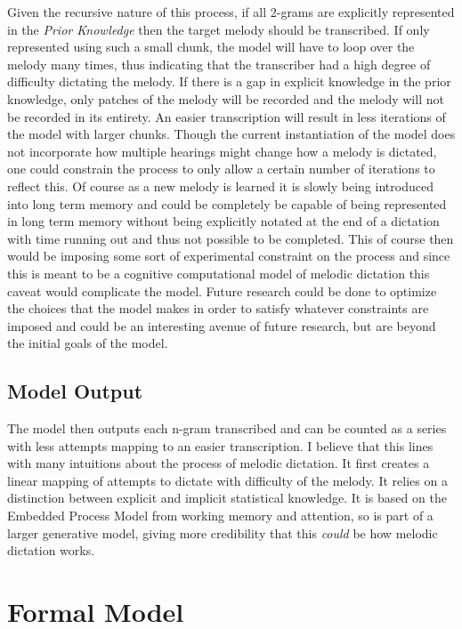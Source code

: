 \documentclass[]{book}
\begin{document}
Given the recursive nature of this process, if all 2-grams are explicitly represented in the \emph{Prior Knowledge} then the target melody should be transcribed.
If only represented using such a small chunk, the model will have to loop over the melody many times, thus indicating that the transcriber had a high degree of difficulty dictating the melody.
If there is a gap in explicit knowledge in the prior knowledge, only patches of the melody will be recorded and the melody will not be recorded in its entirety.
An easier transcription will result in less iterations of the model with larger chunks.
Though the current instantiation of the model does not incorporate how multiple hearings might change how a melody is dictated, one could constrain the process to only allow a certain number of iterations to reflect this.
Of course as a new melody is learned it is slowly being introduced into long term memory and could be completely be capable of being represented in long term memory without being explicitly notated at the end of a dictation with time running out and thus not possible to be completed.
This of course then would be imposing some sort of experimental constraint on the process and since this is meant to be a cognitive computational model of melodic dictation this caveat would complicate the model.
Future research could be done to optimize the choices that the model makes in order to satisfy whatever constraints are imposed and could be an interesting avenue of future research, but are beyond the initial goals of the model.

\hypertarget{model-output}{%
\subsection{Model Output}\label{model-output}}

The model then outputs each n-gram transcribed and can be counted as a series with less attempts mapping to an easier transcription.
I believe that this lines with many intuitions about the process of melodic dictation.
It first creates a linear mapping of attempts to dictate with difficulty of the melody.
It relies on a distinction between explicit and implicit statistical knowledge.
It is based on the Embedded Process Model from working memory and attention, so is part of a larger generative model, giving more credibility that this \emph{could} be how melodic dictation works.

\hypertarget{formal-model}{%
\section{Formal Model}\label{formal-model}}
\end{document}
